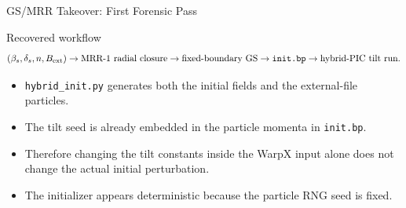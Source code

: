 \documentclass[10pt,aspectratio=169]{beamer}
\begin{document}
\begin{frame}{GS/MRR Takeover: First Forensic Pass}
    \begin{block}{Recovered workflow}
        \[
        (\beta_s,\delta_s,n,B_{\rm ext})
        \rightarrow
        \text{MRR-1 radial closure}
        \rightarrow
        \text{fixed-boundary GS}
        \rightarrow
        \texttt{init.bp}
        \rightarrow
        \text{hybrid-PIC tilt run}.
        \]
    \end{block}

    \vspace{0.25cm}

    \begin{itemize}
        \item \texttt{hybrid\_init.py} generates both the initial fields and
        the external-file particles.
        \item The tilt seed is already embedded in the particle momenta in
        \texttt{init.bp}.
        \item Therefore changing the tilt constants inside the WarpX input alone
        does not change the actual initial perturbation.
        \item The initializer appears deterministic because the particle RNG seed
        is fixed.
    \end{itemize}
\end{frame}
\end{document}
